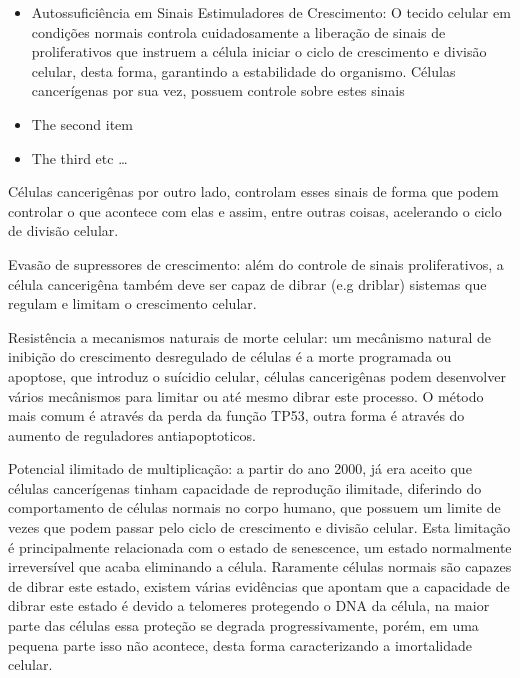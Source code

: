 \documentclass[12pt]{article}
\begin{document}
\begin{itemize}
\item Autossuficiência em Sinais Estimuladores de Crescimento: O tecido celular em condições normais controla cuidadosamente a liberação de sinais de proliferativos que instruem a célula iniciar o ciclo de crescimento e divisão celular, desta forma, garantindo a estabilidade do organismo. Células cancerígenas por sua vez, possuem controle sobre estes sinais
\item The second item
\item The third etc \ldots
\end{itemize}

Células cancerigênas por outro lado, controlam esses sinais de forma que podem controlar o que acontece com elas e assim, entre outras coisas, acelerando o ciclo de divisão celular.

Evasão de supressores de crescimento: além do controle de sinais proliferativos, a célula cancerigêna também deve ser capaz de dibrar (e.g driblar) sistemas que regulam e limitam o crescimento celular.

Resistência a mecanismos naturais de morte celular: um mecânismo natural de inibição do crescimento desregulado de células é a morte programada ou apoptose, que introduz o suícidio celular, células cancerigênas podem desenvolver vários mecânismos para limitar ou até mesmo dibrar este processo. O método mais comum é através da perda da função TP53, outra forma é através do aumento de reguladores antiapoptoticos.

Potencial ilimitado de multiplicação: a partir do ano 2000, já era aceito que células cancerígenas tinham capacidade de reprodução ilimitade, diferindo do comportamento de células normais no corpo humano, que possuem um limite de vezes que podem passar pelo ciclo de crescimento e divisão celular. Esta limitação é principalmente relacionada com o estado de senescence, um estado normalmente irreversível que acaba eliminando a célula. Raramente células normais são capazes de dibrar este estado, existem várias evidências que apontam que a capacidade de dibrar este estado é devido a telomeres protegendo o DNA da célula, na maior parte das células essa proteção se degrada progressivamente, porém, em uma pequena parte isso não acontece, desta forma caracterizando a imortalidade celular.

\end{document}

